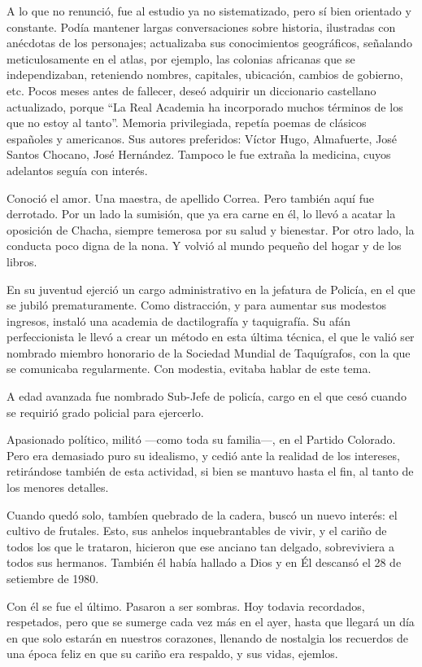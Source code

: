 \documentclass[a4paper]{article}
\begin{document}
A lo que no renunció, fue al estudio ya no sistematizado, pero sí bien orientado y constante. Podía mantener largas conversaciones sobre historia, ilustradas con anécdotas de los personajes; actualizaba sus conocimientos geográficos, señalando meticulosamente en el atlas, por ejemplo, las colonias africanas que se independizaban, reteniendo nombres, capitales, ubicación, cambios de gobierno, etc. Pocos meses antes de fallecer, deseó adquirir un diccionario castellano actualizado, porque ``La Real Academia ha incorporado muchos términos de los que no estoy al tanto''. Memoria privilegiada, repetía poemas de clásicos españoles y americanos. Sus autores preferidos: Víctor Hugo, Almafuerte, José Santos Chocano, José Hernández. Tampoco le fue extraña la medicina, cuyos adelantos seguía con interés.

Conoció el amor. Una maestra, de apellido Correa. Pero también aquí fue derrotado. Por un lado la sumisión, que ya era carne en él, lo llevó a acatar la oposición de Chacha, siempre temerosa por su salud y bienestar. Por otro lado, la conducta poco digna de la nona. Y volvió al mundo pequeño del hogar y de los libros.

En su juventud ejerció un cargo administrativo en la jefatura de Policía, en el que se jubiló prematuramente. Como distracción, y para aumentar sus modestos ingresos, instaló una academia de dactilografía y taquigrafía. Su afán perfeccionista le llevó a crear un método en esta última técnica, el que le valió ser nombrado miembro honorario de la Sociedad Mundial de Taquígrafos, con la que se comunicaba regularmente. Con modestia, evitaba hablar de este tema.

A edad avanzada fue nombrado Sub-Jefe de policía, cargo en el que cesó cuando se requirió grado policial para ejercerlo.

Apasionado político, militó ---como toda su familia---, en el Partido Colorado. Pero era demasiado puro su idealismo, y cedió ante la realidad de los intereses, retirándose también de esta actividad, si bien se mantuvo hasta el fin, al tanto de los menores detalles.

Cuando quedó solo, tambíen quebrado de la cadera, buscó un nuevo interés: el cultivo de frutales. Esto, sus anhelos inquebrantables de vivir, y el cariño de todos los que le trataron, hicieron que ese anciano tan delgado, sobreviviera a todos sus hermanos. También él había hallado a Dios y en Él descansó el 28 de setiembre de 1980.

Con él se fue el último. Pasaron a ser sombras. Hoy todavia recordados, respetados, pero que se sumerge cada vez más en el ayer, hasta que llegará un día en que solo estarán en nuestros corazones, llenando de nostalgia los recuerdos de una época feliz en que su cariño era respaldo, y sus vidas, ejemlos.
\end{document}
